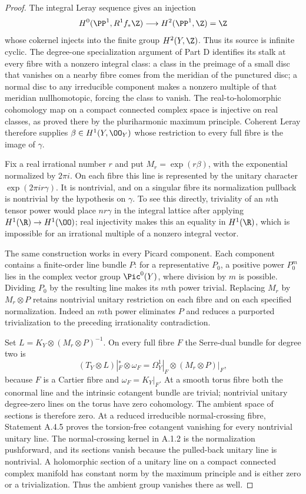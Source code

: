 \begin{proof}
The integral Leray sequence gives an injection
\[
H^0(\PP^1,R^1f_*\Z)\longrightarrow H^2(\PP^1,\Z)=\Z
\]
whose cokernel injects into the finite group $H^2(Y,\Z)$. Thus its source is infinite cyclic. The degree-one specialization argument of Part D identifies its stalk at every fibre with a nonzero integral class: a class in the preimage of a small disc that vanishes on a nearby fibre comes from the meridian of the punctured disc; a normal disc to any irreducible component makes a nonzero multiple of that meridian nullhomotopic, forcing the class to vanish. The real-to-holomorphic cohomology map on a compact connected complex space is injective on real classes, as proved there by the pluriharmonic maximum principle. Coherent Leray therefore supplies $\beta\in H^1(Y,\OO_Y)$ whose restriction to every full fibre is the image of $\gamma$.

Fix a real irrational number $r$ and put $M_r=\exp(r\beta)$, with the exponential normalized by $2\pi i$. On each fibre this line is represented by the unitary character $\exp(2\pi ir\gamma)$. It is nontrivial, and on a singular fibre its normalization pullback is nontrivial by the hypothesis on $\gamma$. To see this directly, triviality of an $n$th tensor power would place $nr\gamma$ in the integral lattice after applying $H^1(\R)\to H^1(\OO)$; real injectivity makes this an equality in $H^1(\R)$, which is impossible for an irrational multiple of a nonzero integral vector.

The same construction works in every Picard component. Each component contains a finite-order line bundle $P$: for a representative $P_0$, a positive power $P_0^m$ lies in the complex vector group $\Pic^0(Y)$, where division by $m$ is possible. Dividing $P_0$ by the resulting line makes its $m$th power trivial. Replacing $M_r$ by $M_r\otimes P$ retains nontrivial unitary restriction on each fibre and on each specified normalization. Indeed an $m$th power eliminates $P$ and reduces a purported trivialization to the preceding irrationality contradiction.

Set $L=K_Y\otimes(M_r\otimes P)^{-1}$. On every full fibre $F$ the Serre-dual bundle for degree two is
\[
 (T_Y\otimes L)|_F^*\otimes\omega_F
       =\Omega_Y^1|_F\otimes(M_r\otimes P)|_F,
\]
because $F$ is a Cartier fibre and $\omega_F=K_Y|_F$. At a smooth torus fibre both the conormal line and the intrinsic cotangent bundle are trivial; nontrivial unitary degree-zero lines on the torus have zero cohomology. The ambient space of sections is therefore zero. At a reduced irreducible normal-crossing fibre, Statement A.4.5 proves the torsion-free cotangent vanishing for every nontrivial unitary line. The normal-crossing kernel in A.1.2 is the normalization pushforward, and its sections vanish because the pulled-back unitary line is nontrivial. A holomorphic section of a unitary line on a compact connected complex manifold has constant norm by the maximum principle and is either zero or a trivialization. Thus the ambient group vanishes there as well.


\end{proof}
